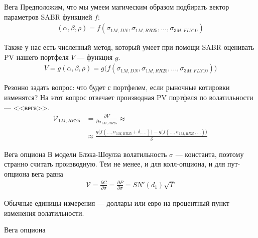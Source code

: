 \documentclass{beamer}
\begin{document}
\begin{frame}{Вега}
\justify
Предположим, что мы умеем магическим образом подбирать вектор параметров SABR функцией $f$:
\begin{align*}
(\alpha, \beta, \rho) = f(\sigma_{1M,DN}, \sigma_{1M,RR25}, ..., \sigma_{3M,FLY10})
\end{align*}

\justify
Также у нас есть численный метод, который умеет при помощи SABR оценивать PV нашего портфеля $V$ --- функция $g$.
\begin{align*}
V = g(\alpha, \beta, \rho) = g\Big(f(\sigma_{1M,DN}, \sigma_{1M,RR25}, ..., \sigma_{3M,FLY10})\Big)
\end{align*}

\justify
Резонно задать вопрос: что будет с портфелем, если рыночные котировки изменятся? На этот вопрос отвечает производная PV портфеля по волатильности --- <<вега>>.
\begin{align*}
\mathcal{V}_{1M,RR25} &= \frac{\partial V}{\partial \sigma_{1M,RR25}} \approx \\
&\approx \frac{g\Big(f(...,\sigma_{1M,RR25}+\delta,...)\Big) - g\Big(f(...,\sigma_{1M,RR25},...)\Big)}{\delta}
\end{align*}
\end{frame}



\begin{frame}{Вега опциона}
\justify
В модели Блэка-Шоулза волатильность $\sigma$ --- константа, поэтому странно считать производную. Тем не менее, и для колл-опциона, и для пут-опциона вега равна
\begin{align*}
\mathcal{V} = \frac{\partial C}{\partial \sigma} = \frac{\partial P}{\partial \sigma} = SN'(d_1)\sqrt{T}
\end{align*}

\justify
Обычные единицы измерения --- доллары или евро на процентный пункт изменения волатильности.
\end{frame}



\begin{frame}{Вега опциона}
\centering
{}
\end{frame}
\end{document}
